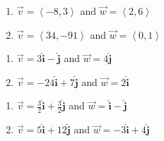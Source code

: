 \documentclass{ximera}
\begin{document}
\begin{multicols}{2} 

\begin{enumerate}

\setcounter{enumi}{\value{HW}}

\item $\vec{v} = \left\langle -8, 3 \right\rangle$ and $\vec{w} = \left\langle 2, 6 \right\rangle$
\item $\vec{v} = \left\langle 34, -91 \right\rangle$ and $\vec{w} = \left\langle 0, 1 \right\rangle$

\setcounter{HW}{\value{enumi}}

\end{enumerate}

\end{multicols}

\begin{multicols}{2} 

\begin{enumerate}

\setcounter{enumi}{\value{HW}}

\item $\vec{v} =3 \bm\hat{\text{i}}-  \bm\hat{\text{j}}$ and $\vec{w} = 4 \bm\hat{\text{j}}$
\item $\vec{v} = -24 \bm\hat{\text{i}}+ 7 \bm\hat{\text{j}}$ and $\vec{w} = 2 \bm\hat{\text{i}}$

\setcounter{HW}{\value{enumi}}

\end{enumerate}

\end{multicols}

\begin{multicols}{2} 

\begin{enumerate}

\setcounter{enumi}{\value{HW}}

\item $\vec{v} =\frac{3}{2}  \bm\hat{\text{i}}+ \frac{3}{2}  \bm\hat{\text{j}}$ and $\vec{w} =  \bm\hat{\text{i}}-  \bm\hat{\text{j}}$
\item $\vec{v} = 5 \bm\hat{\text{i}}+12 \bm\hat{\text{j}}$ and $\vec{w} = -3 \bm\hat{\text{i}}+ 4 \bm\hat{\text{j}}$

\setcounter{HW}{\value{enumi}}

\end{enumerate}

\end{multicols}
\end{document}
